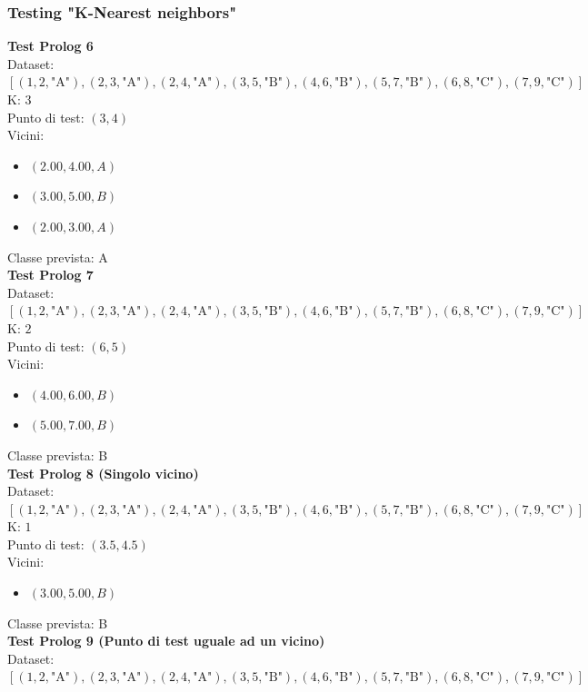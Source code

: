 \documentclass[11pt]{article}
\theoremstyle{definition}
\begin{document}
\subsubsection{Testing "K-Nearest neighbors"}
\textbf{Test Prolog 6}\\
Dataset: $[(1, 2, \text{"A"}), (2, 3, \text{"A"}), (2, 4, \text{"A"}), (3, 5, \text{"B"}), (4, 6, \text{"B"}), (5, 7, \text{"B"}), (6, 8, \text{"C"}), (7, 9, \text{"C"})]$\\
K: $3$\\
Punto di test: $(3, 4)$\\
Vicini:
\begin{itemize}
\item $(2.00,4.00, A)$
\item $(3.00,5.00, B)$
\item $(2.00,3.00, A)$
\end{itemize}
Classe prevista: A\\
\newline
\textbf{Test Prolog 7}\\
Dataset: $[(1, 2, \text{"A"}), (2, 3, \text{"A"}), (2, 4, \text{"A"}), (3, 5, \text{"B"}), (4, 6, \text{"B"}), (5, 7, \text{"B"}), (6, 8, \text{"C"}), (7, 9, \text{"C"})]$\\
K: $2$\\
Punto di test: $(6, 5)$\\
Vicini:
\begin{itemize}
\item $(4.00,6.00, B)$
\item $(5.00,7.00, B)$
\end{itemize}
Classe prevista: B\\
\newline
\textbf{Test Prolog 8 (Singolo vicino)}\\
Dataset: $[(1, 2, \text{"A"}), (2, 3, \text{"A"}), (2, 4, \text{"A"}), (3, 5, \text{"B"}), (4, 6, \text{"B"}), (5, 7, \text{"B"}), (6, 8, \text{"C"}), (7, 9, \text{"C"})]$\\
K: $1$\\
Punto di test: $(3.5, 4.5)$\\
Vicini:
\begin{itemize}
\item $(3.00,5.00, B)$
\end{itemize}
Classe prevista: B\\
\newline
\textbf{Test Prolog 9 (Punto di test uguale ad un vicino)}\\
Dataset: $[(1, 2, \text{"A"}), (2, 3, \text{"A"}), (2, 4, \text{"A"}), (3, 5, \text{"B"}), (4, 6, \text{"B"}), (5, 7, \text{"B"}), (6, 8, \text{"C"}), (7, 9, \text{"C"})]$\\
\end{document}
